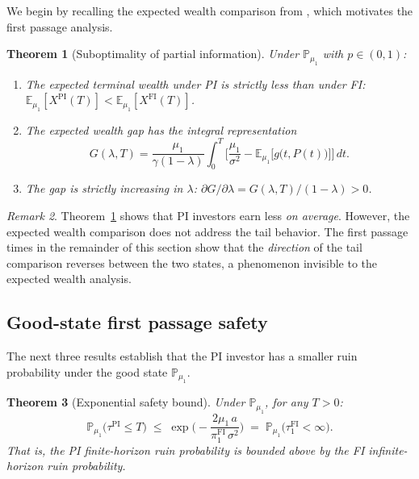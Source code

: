 \documentclass[12pt]{article}
\newtheorem{theorem}{Theorem}[section]
\theoremstyle{remark}
\newtheorem{remark}[theorem]{Remark}
\theoremstyle{definition}
\newcommand{\E}{\mathbb{E}}
\newcommand{\Prob}{\mathbb{P}}
\newcommand{\FI}{\mathrm{FI}}
\newcommand{\PI}{\mathrm{PI}}
\begin{document}
We begin by recalling the expected wealth comparison from
\citet{HuangSun2025}, which motivates the first passage analysis.

\begin{theorem}[Suboptimality of partial information]
\label{thm:wealth}
Under $\Prob_{\mu_1}$ with $p \in (0,1)$:
\begin{enumerate}[label=(\roman*)]
\item The expected terminal wealth under PI is strictly less than
  under FI:
  $\E_{\mu_1}[X^{\PI}(T)] < \E_{\mu_1}[X^{\FI}(T)]$.
\item The expected wealth gap has the integral representation
  \begin{equation}\label{eq:gap_repr}
    G(\lambda, T) = \frac{\mu_1}{\gamma(1-\lambda)}
      \int_0^T \biggl[\frac{\mu_1}{\sigma^2}
      - \E_{\mu_1}\bigl[g\bigl(t, P(t)\bigr)\bigr]\biggr]\,dt.
  \end{equation}
\item The gap is strictly increasing in $\lambda$:
  $\partial G / \partial\lambda = G(\lambda,T)/(1-\lambda) > 0$.
\end{enumerate}
\end{theorem}

\begin{remark}\label{rem:gap_message}
Theorem~\ref{thm:wealth} shows that PI investors earn less \emph{on
average}.
However, the expected wealth comparison does not address the tail
behavior.
The first passage times in the remainder of this section show that
the \emph{direction} of the tail comparison reverses between the
two states, a phenomenon invisible to the expected wealth analysis.
\end{remark}

\subsection{Good-state first passage safety}
\label{sec:good_state}

The next three results establish that the PI investor has a smaller
ruin probability under the good state $\Prob_{\mu_1}$.

\begin{theorem}[Exponential safety bound]
\label{thm:expo_bound}
Under $\Prob_{\mu_1}$, for any $T > 0$:
\begin{equation}\label{eq:expo_bound}
  \Prob_{\mu_1}\bigl(\tau^{\PI} \le T\bigr)
  \;\le\;
  \exp\!\biggl(-\frac{2\mu_1\,a}{\pi_1^{\FI}\,\sigma^2}\biggr)
  \;=\;
  \Prob_{\mu_1}\bigl(\tau_1^{\FI} < \infty\bigr).
\end{equation}
That is, the PI finite-horizon ruin probability is bounded above by the
FI \emph{infinite-horizon} ruin probability.
\end{theorem}
\end{document}

